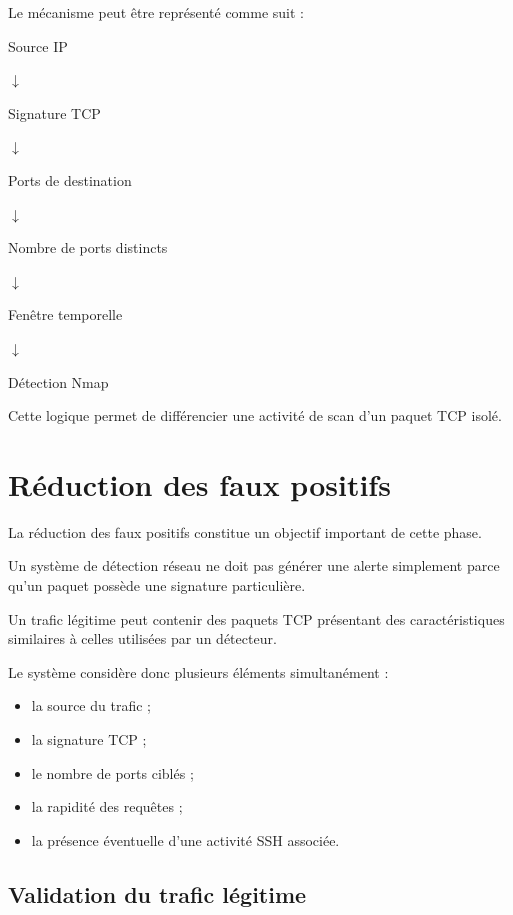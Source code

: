 Le mécanisme peut être représenté comme suit :

\begin{center}

Source IP

$\downarrow$

Signature TCP

$\downarrow$

Ports de destination

$\downarrow$

Nombre de ports distincts

$\downarrow$

Fenêtre temporelle

$\downarrow$

Détection Nmap

\end{center}

Cette logique permet de différencier une activité de scan d'un paquet TCP isolé.

\section{Réduction des faux positifs}

La réduction des faux positifs constitue un objectif important de cette phase.

Un système de détection réseau ne doit pas générer une alerte simplement parce qu'un paquet possède une signature particulière.

Un trafic légitime peut contenir des paquets TCP présentant des caractéristiques similaires à celles utilisées par un détecteur.

Le système considère donc plusieurs éléments simultanément :

\begin{itemize}

\item la source du trafic ;

\item la signature TCP ;

\item le nombre de ports ciblés ;

\item la rapidité des requêtes ;

\item la présence éventuelle d'une activité SSH associée.

\end{itemize}

\subsection{Validation du trafic légitime}

